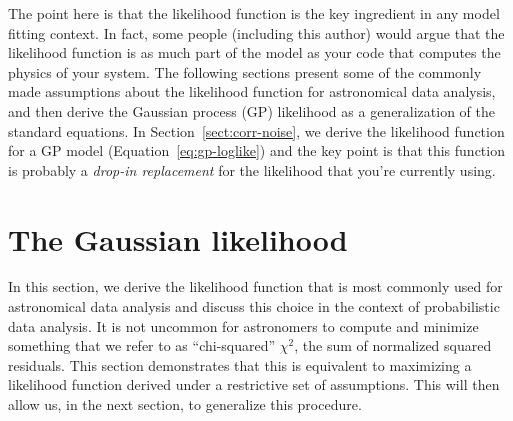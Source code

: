 \documentclass[modern, letterpaper]{aastex61}
\renewcommand{\eqref}[1]{\ref{eq:#1}}
\newcommand{\eqalt}[1]{Equation~\eqref{#1}}
\newcommand{\sectionname}{Section}
\newcommand{\sectref}[1]{\ref{sect:#1}}
\newcommand{\Sect}[1]{\sectionname~\sectref{#1}}
\newcommand{\sect}[1]{\Sect{#1}}
\begin{document}
The point here is that the likelihood function is the key ingredient in any
model fitting context.
In fact, some people (including this author) would argue that the likelihood
function is as much part of the model as your code that computes the physics
of your system.
The following sections present some of the commonly made assumptions about the
likelihood function for astronomical data analysis, and then derive the
Gaussian process (GP) likelihood as a generalization of the standard
equations.
In \sect{corr-noise}, we derive the likelihood function for a GP model
(\eqalt{gp-loglike}) and the key point is that this function is probably a
\emph{drop-in replacement} for the likelihood that you're currently using.

\section{The Gaussian likelihood}

In this section, we derive the likelihood function that is most commonly used
for astronomical data analysis and discuss this choice in the context of
probabilistic data analysis.
It is not uncommon for astronomers to compute and minimize something that we
refer to as ``chi-squared'' $\chi^2$, the sum of normalized squared residuals.
This section demonstrates that this is equivalent to maximizing a likelihood
function derived under a restrictive set of assumptions.
This will then allow us, in the next section, to generalize this procedure.
\end{document}
